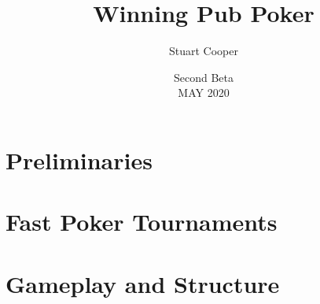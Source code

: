 \documentclass{book}
\begin{document}



\title{Winning Pub Poker}
\author{Stuart Cooper}
\date{Second Beta\\MAY 2020}


\maketitle
\tableofcontents

\part{Preliminaries}







\part{Fast Poker Tournaments}






\part{Gameplay and Structure}



\end{document}
